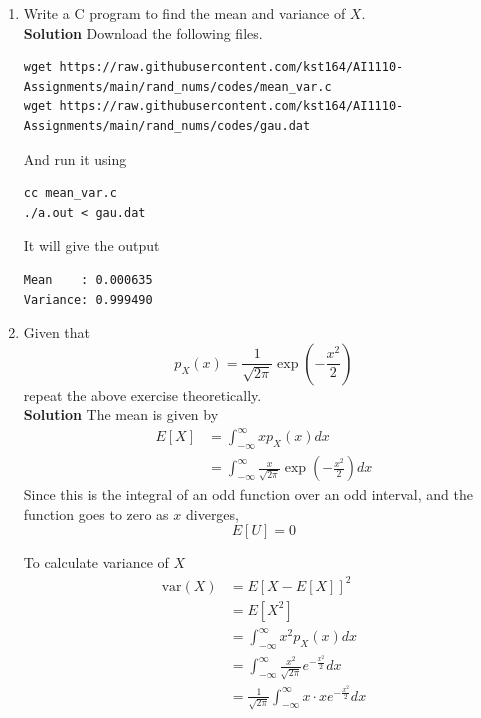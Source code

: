 \documentclass[journal, 12pt, twocolumn]{IEEEtran}
\begin{document}
\begin{enumerate}[label=\arabic{section}.\arabic*]
    \item
        Write a C program to find the mean and variance of $X$.
        \\
        \textbf{Solution} Download the following files.
        \begin{lstlisting}
wget https://raw.githubusercontent.com/kst164/AI1110-Assignments/main/rand_nums/codes/mean_var.c
wget https://raw.githubusercontent.com/kst164/AI1110-Assignments/main/rand_nums/codes/gau.dat
        \end{lstlisting}
        And run it using
        \begin{lstlisting}
cc mean_var.c
./a.out < gau.dat
        \end{lstlisting}
        It will give the output
        \begin{lstlisting}
Mean    : 0.000635
Variance: 0.999490
        \end{lstlisting}

    \item
        Given that
        \begin{equation}
            p_X(x) = \frac{1}{\sqrt{2 \pi}} \exp \left(-\frac{x^2}{2}\right)
        \end{equation}
        repeat the above exercise theoretically.
        \\
        \textbf{Solution}
        The mean is given by
        \begin{align}
            E\left[X\right] &= \int_{-\infty}^{\infty}{x p_X(x) dx} \\
            &= \int_{-\infty}^{\infty}{\frac{x}{\sqrt{2 \pi}} \exp\left(-\frac{x^2}{2}\right) dx}
        \end{align}
        Since this is the integral of an odd function over an odd interval, and the function goes to zero as $x$ diverges,
        \begin{equation}
            E\left[U\right] = 0
        \end{equation}

        To calculate variance of $X$
        \begin{align}
            \text{var}(X) &= E\left[X - E[X]\right]^2 \\
            &= E\left[X^2\right] \\
            &= \int_{-\infty}^{\infty}{x^2 p_X(x) dx} \\
            &= \int_{-\infty}^{\infty}{\frac{x^2}{\sqrt{2 \pi}} e^{-\frac{x^2}{2}} dx} \\
            &= \frac{1}{\sqrt{2 \pi}} \int_{-\infty}^{\infty}{x \cdot x e^{-\frac{x^2}{2}} dx}
        \end{align}


\end{enumerate}
\end{document}
